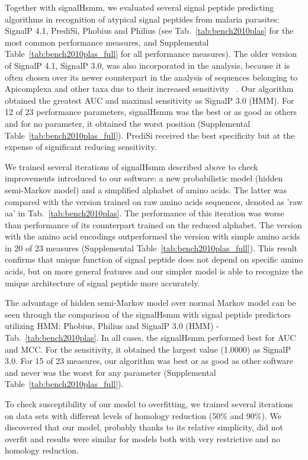 \documentclass[10pt,letterpaper]{article}
\begin{document}
Together with signalHsmm, we evaluated several signal peptide predicting algorithms in recognition of atypical signal peptides from malaria parasites: SignalP 4.1, PrediSi, Phobius and Philius (see Tab.~\ref{tab:bench2010plas} for the most common performance measures, and Supplemental Table~\ref{tab:bench2010plas_full} for all performance measures). The older version of SignalP 4.1, SignalP 3.0, was also incorporated in the analysis, because it is often chosen over its newer counterpart in the analysis of sequences belonging to Apicomplexa and other taxa due to their increased sensitivity ~\cite{2012cilingirapicoap, sperschneider_evaluation_2015}. 
Our algorithm obtained the greatest AUC and maximal sensitivity as SignalP 3.0 (HMM). For 12 of 23 performance parameters, signalHsmm was the best or as good as others and for no parameter, it obtained the worst position (Supplemental Table~\ref{tab:bench2010plas_full}). PrediSi received the best specificity but at the expense of significant reducing sensitivity.

We trained several iterations of signalHsmm  described above to check improvements introduced to our software: a new probabilistic model (hidden semi-Markov model) and a simplified alphabet of amino acids. The latter was compared with the version trained on raw amino acids sequences, denoted as 'raw aa' in Tab.~\ref{tab:bench2010plas}. The performance of this iteration was  worse than performance of its counterpart trained on the reduced alphabet. The version with the amino acid encodings outperformed the version with simple amino acids in 20 of 23 measures (Supplemental Table~\ref{tab:bench2010plas_full}). This result confirms that unique function of signal peptide does not depend on specific amino acids, but on more general features and our simpler model is able to recognize the unique architecture of signal peptide more accurately.

The advantage of hidden semi-Markov model over normal Markov model can be seen through the comparison of the signalHsmm with signal peptide predictors utilizing HMM: Phobius, Philius and SignalP 3.0 (HMM) - Tab.~\ref{tab:bench2010plas}. In all cases, the signalHsmm performed best for AUC and MCC. For the sensitivity, it obtained the largest value (1.0000) as SignalP 3.0. For 15 of 23 measures, our algorithm was best or as good as other software and never was the worst for any parameter (Supplemental Table~\ref{tab:bench2010plas_full}).

To check susceptibility of our model to overfitting, we trained several iterations on data sets with different levels of homology reduction (50\% and 90\%). We discovered that our model, probably thanks to its relative simplicity, did not overfit and results were similar for models both with very restrictive and no homology reduction.
\end{document}
